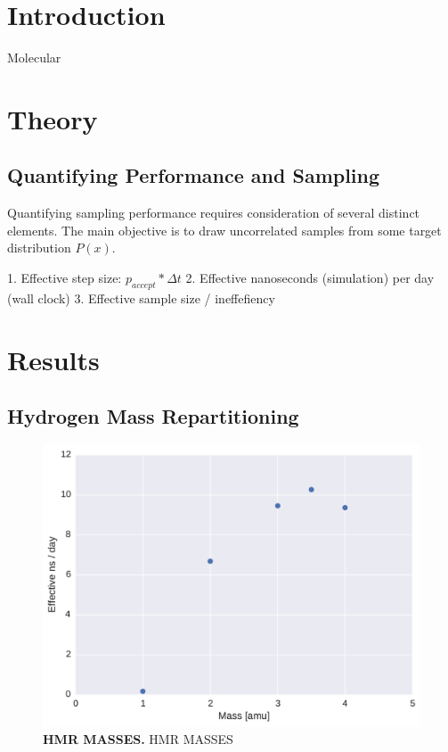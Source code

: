 \documentclass[aps,pre,twocolumn,nofootinbib,superscriptaddress,linenumbers]{revtex4-1}
\begin{document}
\section{Introduction}

Molecular

\section{Theory}

\subsection{Quantifying Performance and Sampling}

Quantifying sampling performance requires consideration of several distinct elements.  
The main objective is to draw uncorrelated samples from some target distribution $P(x)$.  

1.  Effective step size: $p_{accept} * \Delta t$
2.  Effective nanoseconds (simulation) per day (wall clock)
3.  Effective sample size / ineffefiency



\section{Results}

\subsection{Hydrogen Mass Repartitioning}

\begin{figure}
\includegraphics[width=\columnwidth]{./figures/hmr_masses.pdf}
\caption{{\bf HMR MASSES.}
HMR MASSES
}
\label{figure:hmr_masses}
\end{figure}
\end{document}
